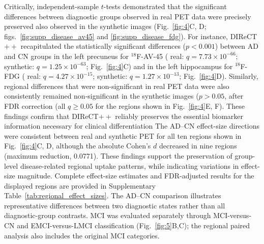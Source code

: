 \documentclass{article}
\providecommand{\DIFaddtex}[1]{{\protect\color{blue} \sf #1}} %
\providecommand{\DIFdeltex}[1]{{\protect\color{red} \scriptsize #1}} %
\providecommand{\DIFaddbegin}{} %
\providecommand{\DIFaddend}{} %
\providecommand{\DIFdelbegin}{} %
\providecommand{\DIFdelend}{} %
\providecommand{\DIFadd}[1]{\texorpdfstring{\DIFaddtex{#1}}{#1}} %
\providecommand{\DIFdel}[1]{\texorpdfstring{\DIFdeltex{#1}}{}} %
\newcommand{\DIFscaledelfig}{0.5}
\newlength{\DIFdelgraphicswidth} %
\newlength{\DIFdelgraphicsheight} %
\newcommand{\DIFaddincludegraphics}[2][]{{\color{blue}\fbox{\DIFOincludegraphics[#1]{#2}}}} %
\newcommand{\DIFdelincludegraphics}[2][]{%
\sbox{\DIFdelgraphicsbox}{\DIFOincludegraphics[#1]{#2}}%
\settoboxwidth{\DIFdelgraphicswidth}{\DIFdelgraphicsbox} %
\settoboxtotalheight{\DIFdelgraphicsheight}{\DIFdelgraphicsbox} %
\scalebox{\DIFscaledelfig}{%
\parbox[b]{\DIFdelgraphicswidth}{\usebox{\DIFdelgraphicsbox}\\[-\baselineskip] \rule{\DIFdelgraphicswidth}{0em}}\llap{\resizebox{\DIFdelgraphicswidth}{\DIFdelgraphicsheight}{%
\setlength{\unitlength}{\DIFdelgraphicswidth}%
\begin{picture}(1,1)%
\thicklines\linethickness{2pt} %
{\color[rgb]{1,0,0}\put(0,0){\framebox(1,1){}}}%
{\color[rgb]{1,0,0}\put(0,0){\line( 1,1){1}}}%
{\color[rgb]{1,0,0}\put(0,1){\line(1,-1){1}}}%
\end{picture}%
}\hspace*{3pt}}} %
} %
\DeclareRobustCommand{\DIFaddbegin}{\DIFOaddbegin \let\includegraphics\DIFaddincludegraphics} %
\DeclareRobustCommand{\DIFaddend}{\DIFOaddend \let\includegraphics\DIFOincludegraphics} %
\DeclareRobustCommand{\DIFdelbegin}{\DIFOdelbegin \let\includegraphics\DIFdelincludegraphics} %
\DeclareRobustCommand{\DIFdelend}{\DIFOaddend \let\includegraphics\DIFOincludegraphics} %
\begin{document}
Critically, independent-sample $t$-tests demonstrated that the significant differences between diagnostic groups observed in real PET data were \DIFdelbegin \DIFdel{precisely preserved }\DIFdelend \DIFaddbegin \DIFadd{also observed }\DIFaddend in the synthetic images (Fig.~\ref{fig:4}C, D; figs.~\ref{fig:supp_disease_av45} and \ref{fig:supp_disease_fdg}). For instance, DIReCT$++$ recapitulated the statistically significant differences \DIFdelbegin \DIFdel{($p<0.001$) }\DIFdelend between AD and CN groups in the \DIFaddbegin \DIFadd{left }\DIFaddend precuneus for $^{18}$F-AV-45 (\DIFaddbegin \DIFadd{real: $q=7.73\times10^{-66}$; synthetic: $q=1.25\times10^{-63}$; }\DIFaddend Fig.~\ref{fig:4}C) and in the \DIFaddbegin \DIFadd{left }\DIFaddend hippocampus for $^{18}$F-FDG (\DIFaddbegin \DIFadd{real: $q=4.27\times10^{-15}$; synthetic: $q=1.27\times10^{-13}$; }\DIFaddend Fig.~\ref{fig:4}D). Similarly, regional differences that were non-significant in real PET data \DIFdelbegin \DIFdel{were also consistently }\DIFdelend \DIFaddbegin \DIFadd{remained }\DIFaddend non-significant in the synthetic images \DIFdelbegin \DIFdel{($p>0.05$, }\DIFdelend \DIFaddbegin \DIFadd{after FDR correction (all $q\geq0.05$ for the regions shown in }\DIFaddend Fig.~\ref{fig:4}E, F). \DIFdelbegin \DIFdel{These findings confirm that DIReCT$++$ reliably preserves the essential biomarker information necessary for clinical differentiation}\DIFdelend \DIFaddbegin \DIFadd{The AD--CN effect-size directions were consistent between real and synthetic PET for all ten regions shown in Fig.~\ref{fig:4}C, D, although the absolute Cohen's $d$ decreased in nine regions (maximum reduction, 0.0771). These findings support the preservation of group-level disease-related regional uptake patterns, while indicating variations in effect-size magnitude. Complete effect-size estimates and FDR-adjusted results for the displayed regions are provided in Supplementary Table~\ref{tab:regional_effect_sizes}. The AD--CN comparison illustrates representative differences between two diagnostic states rather than all diagnostic-group contrasts. MCI was evaluated separately through MCI-versus-CN and EMCI-versus-LMCI classification (Fig.~\ref{fig:5}B,C); the regional paired analysis also includes the original MCI categories}\DIFaddend .
\end{document}
